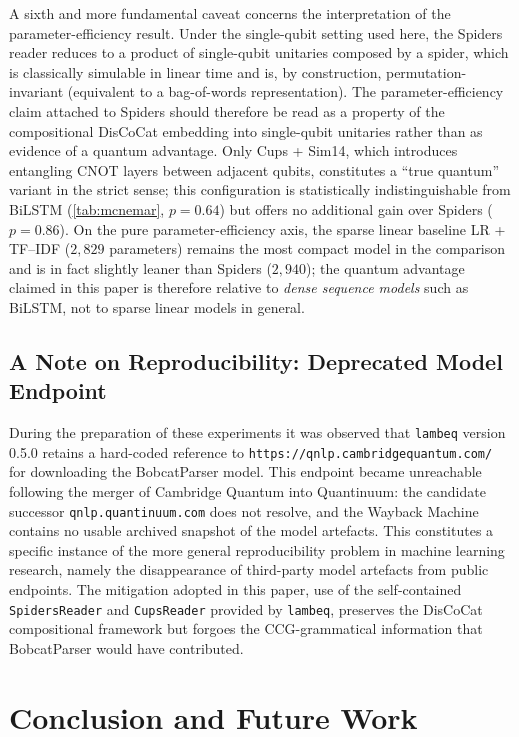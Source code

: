 \documentclass[runningheads]{llncs}
\begin{document}
A sixth and more fundamental caveat concerns the interpretation of the
parameter-efficiency result. Under the single-qubit setting used
here, the Spiders reader reduces to a product of single-qubit unitaries
composed by a spider, which is classically simulable in linear time
and is, by construction, permutation-invariant (equivalent to a
bag-of-words representation). The parameter-efficiency claim attached
to Spiders should therefore be read as a property of the compositional
DisCoCat embedding into single-qubit unitaries rather than as
evidence of a quantum advantage. Only Cups + Sim14, which introduces
entangling CNOT layers between adjacent qubits, constitutes a ``true
quantum'' variant in the strict sense; this configuration is
statistically indistinguishable from BiLSTM
(\cref{tab:mcnemar}, \(p=0.64\)) but offers no additional gain over
Spiders (\(p=0.86\)). On the pure parameter-efficiency axis, the
sparse linear baseline LR + TF--IDF (\(2{,}829\) parameters) remains
the most compact model in the comparison and is in fact slightly
leaner than Spiders (\(2{,}940\)); the quantum advantage claimed in
this paper is therefore relative to \emph{dense sequence models} such
as BiLSTM, not to sparse linear models in general.

\subsection{A Note on Reproducibility: Deprecated Model Endpoint}

During the preparation of these experiments it was observed that
\texttt{lambeq} version 0.5.0 retains a hard-coded reference to
\texttt{https://qnlp.cambridgequantum.com/} for downloading the
BobcatParser model. This endpoint became unreachable following the
merger of Cambridge Quantum into Quantinuum: the candidate successor
\texttt{qnlp.quantinuum.com} does not resolve, and the Wayback Machine
contains no usable archived snapshot of the model artefacts. This
constitutes a specific instance of the more general reproducibility
problem in machine learning research, namely the disappearance of
third-party model artefacts from public endpoints. The mitigation
adopted in this paper, use of the self-contained
\texttt{SpidersReader} and \texttt{CupsReader} provided by
\texttt{lambeq}, preserves the DisCoCat compositional framework but
forgoes the CCG-grammatical information that BobcatParser would have
contributed.

\section{Conclusion and Future Work}\label{sec:conclusion}
\end{document}
